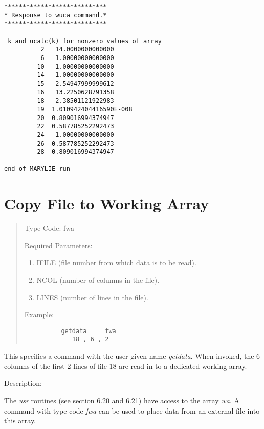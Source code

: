 \begin{footnotesize}
\begin{verbatim}
****************************
* Response to wuca command.*
****************************

 k and ucalc(k) for nonzero values of array
          2   14.0000000000000
          6   1.00000000000000
         10   1.00000000000000
         14   1.00000000000000
         15   2.54947999999612
         16   13.2250628791358
         18   2.38501121922983
         19  1.010942404416590E-008
         20  0.809016994374947
         22  0.587785252292473
         24   1.00000000000000
         26 -0.587785252292473
         28  0.809016994374947

end of MARYLIE run
\end{verbatim}
\end{footnotesize}

\newpage
\section{Copy File to Working Array}    
\begin{quotation}
\noindent Type Code:  fwa
\vspace{5mm}

\noindent Required Parameters:
\begin{enumerate}
\item IFILE (file number from which data is to be read).

\item NCOL (number of columns in the file).


\item LINES (number of lines in the file).
\end{enumerate}

\vspace{5mm}
\noindent Example:
\begin{verbatim}
          getdata     fwa
             18 , 6 , 2
\end{verbatim}
\end{quotation}
This specifies a command with the user given name {\em getdata}.  When invoked, the 6 columns of the first 2 lines of file 18 are read in to a dedicated working array.

\vspace{5mm}
Description:
\vspace{2mm}

The {\em usr} routines (see section 6.20 and 6.21) have access to the array {\em wa}.  A command with type code {\em fwa} can be used to place data from an external file into this array.

